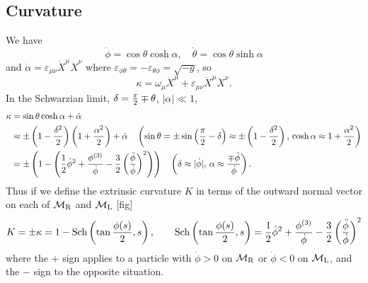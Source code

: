 \documentclass[12pt]{article}
\newcommand{\be}{\begin{equation}}
\newcommand{\ee}{\end{equation}}
\newcommand{\nn}{\nonumber\\}
\newcommand{\vep}{\varepsilon}
\newcommand{\calM}{\mathcal{M}}
\DeclareMathOperator{\Sch}{Sch}
\newcommand{\al}{\alpha}
\newcommand{\tht}{\theta}
\newcommand{\ka}{\kappa}
\newcommand{\om}{\omega}
\newcommand{\de}{\delta}
\newcommand{\ov}{\over}
\begin{document}
\subsection{Curvature}
We have 
\be
\dot{\phi}=\cos\tht \cosh \al, \quad \dot{\tht}=\cos \tht \sinh\al
\ee and $\dot{\al}=\vep_{\mu\nu}\dot{X}^{\mu}\ddot{X}^{\nu}$ where $\vep_{\phi \tht}=-\vep_{\tht\phi}=\sqrt{-g}$, so
\be
\ka=\om_{\mu}\dot{X}^{\mu}+\vep_{\mu\nu}\dot{X}^{\mu}\ddot{X}^{\nu}.
\ee
In the Schwarzian limit, $\de={\pi \ov 2}\mp \tht$, $|\al| \ll 1$, 
\begin{align}
\ka&=\sin\tht \cosh \al + \dot{\al}\nn
&\approx \pm \left(1-{\de^2 \ov 2}\right)\left(1+{\al^2 \ov 2}\right)+\dot{\al} \quad \left(\sin\tht=\pm \sin\left({\pi \ov 2}-\de\right)\approx \pm \left(1-{\de^2 \ov 2} \right), \,   \cosh\al \approx 1+{\al^2 \ov 2}\right)\nn
&=\pm \left(1-\left({1 \ov 2}\dot{\phi}^2 + {\phi^{(3)} \ov \dot{\phi}} -{3 \ov 2}\left({\ddot{\phi} \ov \dot{\phi}}\right)^2\right)\right)
 \quad \left(\de\approx |\dot{\phi}|,\,  \al\approx {\mp \ddot{\phi} \ov \dot{\phi}}\right).
 \end{align}
Thus if we define the extrinsic curvature $K$ in terms of the outward normal vector on each of $\calM_{\rm R}$ and $\calM_{\rm L}$ [fig]
\be \label{KSch}
K=\pm \ka = 1-\Sch\left(\tan{\phi(s) \ov 2}, s\right), \qquad \Sch\left(\tan{\phi(s) \ov 2}, s\right)={1 \ov 2}\dot{\phi}^2 + {\phi^{(3)} \ov \dot{\phi}} -{3 \ov 2}\left({\ddot{\phi} \ov \dot{\phi}}\right)^2
\ee
where the $+$ sign applies to a particle with $\dot{\phi}>0$ on $\calM_{\rm R}$ or $\dot{\phi}<0$ on $\calM_{\rm L}$, and the $-$ sign to the opposite situation.
\end{document}
